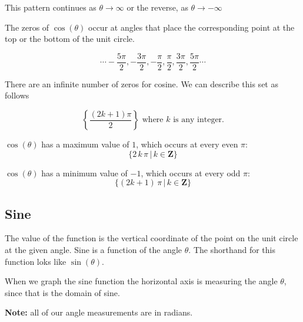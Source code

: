 \documentclass{ximera}
\begin{document}
This pattern continues as $\theta \rightarrow \infty$ or the reverse, as $\theta \rightarrow -\infty$

The zeros of $\cos(\theta)$ occur at angles that place the corresponding point at the top or the bottom of the unit circle.  


\[     \cdots -\frac{5\pi}{2},  -\frac{3\pi}{2},  -\frac{\pi}{2},  \frac{\pi}{2},  \frac{3\pi}{2},  \frac{5\pi}{2} \cdots \]


There are an infinite number of zeros for cosine.  We can describe this set as follows


\[  \left\{     \frac{(2k+1)\pi}{2}          \right\}    \text{ where }  k  \text{ is any integer.}     \]





$\cos(\theta)$ has a maximum value of $1$, which occurs at every even $\pi$:  
\[ \{  2 \, k \, \pi \, | \, k \in \textbf{Z}\} \]



$\cos(\theta)$ has a minimum value of $-1$, which occurs at every odd $\pi$:  
\[ \{  (2k+1) \, \pi \, | \, k \in \textbf{Z}\} \]











\subsection*{Sine}

The value of the function is the vertical coordinate of the point on the unit circle at the given angle. Sine is a function of the angle $\theta$. The shorthand for this function loks like $\sin(\theta)$. 



When we graph the sine function the horizontal axis is measuring the angle $\theta$, since that is the domain of sine.

\textbf{Note:}  all of our angle measurements are in radians.
\end{document}
